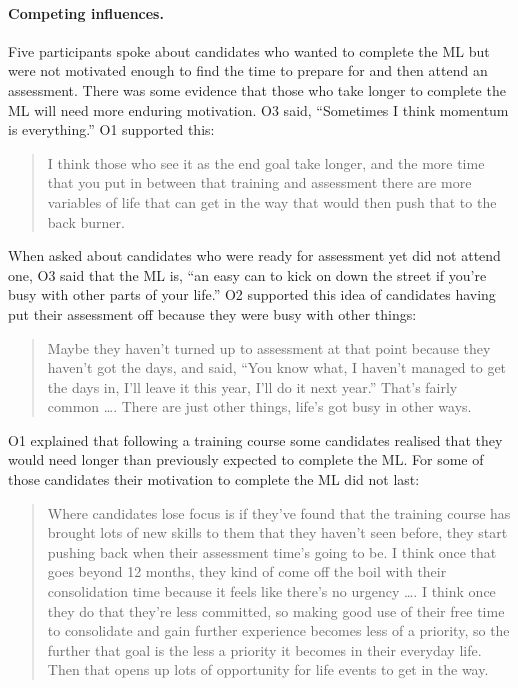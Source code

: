 \documentclass[a4paper,]{book}
\let\oldparagraph\paragraph
\renewcommand{\paragraph}[1]{\oldparagraph{#1}\mbox{}}
\begin{document}
\hypertarget{competing-influences.}{%
\paragraph{Competing influences.}\label{competing-influences.}}

Five participants spoke about candidates who wanted to complete the ML but were not motivated enough to find the time to prepare for and then attend an assessment. There was some evidence that those who take longer to complete the ML will need more enduring motivation. O3 said, ``Sometimes I think momentum is everything.'' O1 supported this:

\begin{quote}
I think those who see it as the end goal take longer, and the more time that you put in between that training and assessment there are more variables of life that can get in the way that would then push that to the back burner.
\end{quote}

When asked about candidates who were ready for assessment yet did not attend one, O3 said that the ML is, ``an easy can to kick on down the street if you're busy with other parts of your life.'' O2 supported this idea of candidates having put their assessment off because they were busy with other things:

\begin{quote}
Maybe they haven't turned up to assessment at that point because they haven't got the days, and said, ``You know what, I haven't managed to get the days in, I'll leave it this year, I'll do it next year.'' That's fairly common \ldots{}. There are just other things, life's got busy in other ways.
\end{quote}

O1 explained that following a training course some candidates realised that they would need longer than previously expected to complete the ML. For some of those candidates their motivation to complete the ML did not last:

\begin{quote}
Where candidates lose focus is if they've found that the training course has brought lots of new skills to them that they haven't seen before, they start pushing back when their assessment time's going to be. I think once that goes beyond 12 months, they kind of come off the boil with their consolidation time because it feels like there's no urgency \ldots{}. I think once they do that they're less committed, so making good use of their free time to consolidate and gain further experience becomes less of a priority, so the further that goal is the less a priority it becomes in their everyday life. Then that opens up lots of opportunity for life events to get in the way.
\end{quote}
\end{document}
